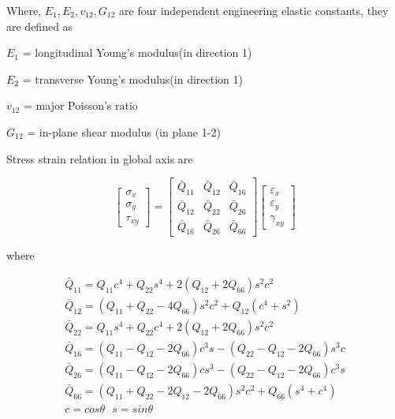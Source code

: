 \documentclass[smallextended]{svjour3}       %
\begin{document}
Where, $E_1, E_2, v_{12}, G_{12}$ are four independent engineering elastic constants, they are
defined as 
\vspace{3mm}

$E_1$ = longitudinal Young's modulus(in direction 1)

$E_2$ = transverse  Young's modulus(in direction 1)

$v_{12}$ = major Poisson's ratio

$G_{12}$ = in-plane shear modulus (in plane 1-2)
\vspace{3mm}

Stress strain relation in global axis are

\begin{equation}
	\left[\begin{array}{l}\sigma_{x} \\ \sigma_{y} \\ \tau_{x
			y}\end{array}\right]=\left[\begin{array}{lll}\bar{Q}_{11} & \bar{Q}_{12} & \bar{Q}_{16}
			\\ \bar{Q}_{12} & \bar{Q}_{22} & \bar{Q}_{26} \\ \bar{Q}_{16} & \bar{Q}_{26} &
			\bar{Q}_{66}\end{array}\right]\left[\begin{array}{l}\varepsilon_{x} \\ \varepsilon_{y}
	\\ \gamma_{x y}\end{array}\right]
\end{equation}

where

\begin{equation}
	\begin{array}{l}
		\bar{Q}_{11}=Q_{11} c^{4}+Q_{22} s^{4}+2\left(Q_{12}+2 Q_{66}\right) s^{2} c^{2}
		\\ 
		\bar{Q}_{12}=\left(Q_{11}+Q_{22}-4 Q_{66}\right) s^{2} c^{2}+Q_{12}\left(c^{4}+s^{2}\right)
		\\ 
		\bar{Q}_{22}=Q_{11} s^{4}+Q_{22} c^{4}+2\left(Q_{12}+2 Q_{66}\right) s^{2} c^{2} \\

		\bar{Q}_{16}=\left(Q_{11}-Q_{12}-2 Q_{66}\right) c^{3} s-\left(Q_{22}-Q_{12}-2
			Q_{66}\right) s^{3} c \\ 
		\bar{Q}_{26}=\left(Q_{11}-Q_{12}-2 Q_{66}\right) c s^{3}-\left(Q_{22}-Q_{12}-2 Q_{66}\right)
		c^{3} s \\ 
		\bar{Q}_{66}=\left(Q_{11}+Q_{22}-2 Q_{12}-2 Q_{66}\right) s^{2}
		c^{2}+Q_{66}\left(s^{4}+c^{4}\right)\\
	c=cos\theta \text{   }s=sin\theta
	\end{array}
\end{equation}
\end{document}
